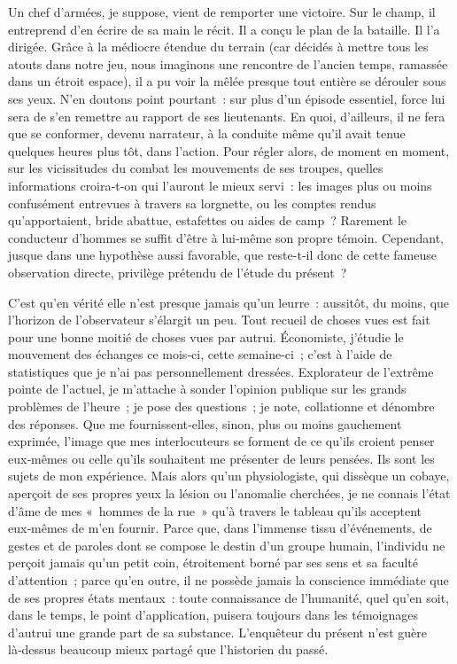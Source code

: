 \documentclass[french,twoside]{book} %
\begin{document}
\noindent Un chef d’armées, je suppose, vient de remporter une victoire. Sur le champ, il entreprend d’en écrire de sa main le récit. Il a conçu le plan de la bataille. Il l’a dirigée. Grâce à la médiocre étendue du terrain (car décidés à mettre tous les atouts dans notre jeu, nous imaginons une ren­contre de l’ancien temps, ramassée dans un étroit espace), il a pu voir la mêlée presque tout entière se dérouler sous ses yeux. N’en doutons point pourtant : sur plus d’un épisode essentiel, force lui sera de s’en  
\label{p18} remettre au rapport de ses lieutenants. En quoi, d’ailleurs, il ne fera que se conformer, devenu narrateur, à la conduite même qu’il avait tenue quelques heures plus tôt, dans l’action. Pour régler alors, de moment en moment, sur les vicissitudes du combat les mouvements de ses troupes, quelles informations croira‑t‑on qui l’auront le mieux servi : les images plus ou moins confusément entrevues à travers sa lorgnette, ou les comptes rendus qu’apportaient, bride abattue, estafettes ou aides de camp ? Rarement le conducteur d’hommes se suffit d’être à lui-même son propre témoin. Cependant, jusque dans une hypothèse aussi favorable, que reste-­t‑il donc de cette fameuse observation directe, privilège prétendu de l’étude du présent ?\par
C’est qu’en vérité elle n’est presque jamais qu’un leurre : aussitôt, du moins, que l’horizon de l’observateur s’élargit un peu. Tout recueil de choses vues est fait pour une bonne moitié de choses vues par autrui. Économiste, j’étudie le mouvement des échanges ce mois‑ci, cette semaine-­ci ; c’est à l’aide de statistiques que je n’ai pas personnellement dressées. Explorateur de l’extrême pointe de l’actuel, je m’attache à sonder l’opinion publique sur les grands problèmes de l’heure ; je pose des questions ; je note, collationne et dénombre des réponses. Que me fournissent‑elles, sinon, plus ou moins gauchement exprimée, l’image que mes interlocuteurs se forment de ce qu’ils croient penser eux‑mêmes ou celle qu’ils souhaitent me présenter de leurs pensées. Ils sont les sujets de mon expérience. Mais alors qu’un physiologiste, qui dissèque un cobaye, aperçoit de ses propres yeux la lésion ou l’anomalie cherchées, je ne connais l’état d’âme de mes « hommes de la rue » qu’à travers le tableau qu’ils acceptent eux‑mêmes de m’en fournir. Parce que, dans l’immense tissu d’événements, de gestes et de paroles dont se compose le destin d’un groupe humain, l’individu ne perçoit jamais qu’un petit coin, étroitement borné par ses sens et sa faculté d’attention ; parce qu’en outre, il ne possède jamais la conscience immédiate que de ses propres états mentaux : toute connaissance de l’humanité, quel qu’en soit, dans le temps, le point d’application, puisera toujours dans les témoignages d’autrui une grande part de sa substance. L’enquêteur du présent n’est guère là‑dessus beaucoup mieux partagé que l’historien du passé.\par
\end{document}
